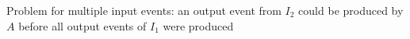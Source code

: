 Problem for multiple input events: an output event from \(I_2\) could be produced by \(A\) before all output events of \(I_1\) were produced




